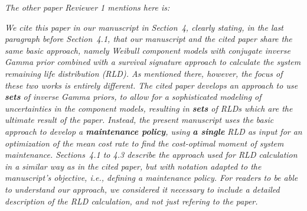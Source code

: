 \documentclass[authoryear]{elsarticle}
\begin{document}
\smallskip

\emph{The other paper Reviewer 1 mentions here is:}

\nocite{2016:walter-coolen}


\smallskip

\emph{We cite this paper in our manuscript in Section~4,
clearly stating, in the last paragraph before Section~4.1,
that our manuscript and the cited paper share the same basic approach, namely
Weibull component models with conjugate inverse Gamma prior
combined with a survival signature approach to calculate the system remaining life distribution (RLD).
As mentioned there, however, the focus of these two works is entirely different.
The cited paper develops an approach to use \textbf{sets} of inverse Gamma priors,
to allow for a sophisticated modeling of uncertainties in the component models,
resulting in \textbf{sets} of RLDs which are the ultimate result of the paper.
Instead, the present manuscript uses the basic approach to develop a \textbf{maintenance policy},
using \textbf{a single} RLD as input for an optimization of the mean cost rate to find the cost-optimal moment of system maintenance.
Sections~4.1 to 4.3 describe the approach used for RLD calculation
in a similar way as in the cited paper,
but with notation adapted to the manuscript's objective, i.e., defining a maintenance policy.
For readers to be able to understand our approach,
we considered it necessary to include a detailed description of the RLD calculation,
and not just refering to the paper.
}

\medskip
\end{document}
